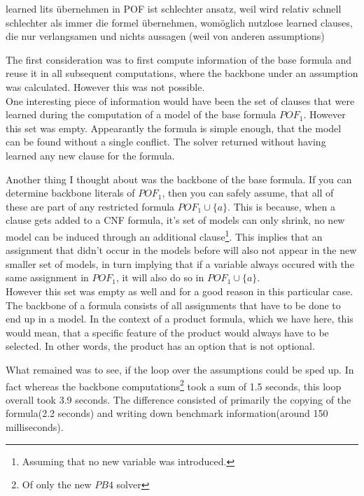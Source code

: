 learned lits übernehmen in POF ist schlechter ansatz, weil wird relativ schnell schlechter als immer die formel übernehmen, womöglich nutzlose learned clauses, die nur verlangsamen und nichts aussagen (weil von anderen assumptions)



The first consideration was to first compute information of the base formula and reuse it in all subsequent computations, where the backbone under an assumption was calculated. However this was not possible.\\
One interesting piece of information would have been the set of clauses that were learned during the computation of a model of the base formula $POF_1$. However this set was empty. Appearantly the formula is simple enough, that the model can be found without a single conflict. The solver returned without having learned any new clause for the formula.

Another thing I thought about was the backbone of the base formula. If you can determine backbone literals of $POF_1$, then you can safely assume, that all of these are part of any restricted formula $POF_1 \cup \{a\}$. This is because, when a clause gets added to a CNF formula, it's set of models can only shrink, no new model can be induced through an additional clause\footnote{Assuming that no new variable was introduced.}. This implies that an assignment that didn't occur in the models before will also not appear in the new smaller set of models, in turn implying that if a variable always occured with the same assignment in $POF_1$, it will also do so in $POF_1 \cup \{a\}$. \\
However this set was empty as well and for a good reason in this particular case. The backbone of a formula consists of all assignments that have to be done to end up in a model. In the context of a product formula, which we have here, this would mean, that a specific feature of the product would always have to be selected. In other words, the product has an option that is not optional. 

What remained was to see, if the loop over the assumptions could be sped up. In fact whereas the backbone computations\footnote{Of only the new $PB4$ solver} took a sum of 1.5 seconds, this loop overall took 3.9 seconds. The difference consisted of primarily the copying of the formula(2.2 seconds) and writing down benchmark information(around 150 milliseconds). 

